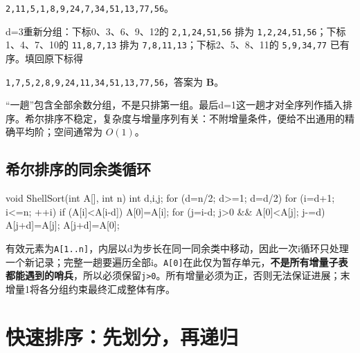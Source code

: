 \texttt{2,\allowbreak{}11,\allowbreak{}5,\allowbreak{}1,\allowbreak{}8,\allowbreak{}9,\allowbreak{}24,\allowbreak{}7,\allowbreak{}34,\allowbreak{}51,\allowbreak{}13,\allowbreak{}77,\allowbreak{}56}。

d=3重新分组：下标0、3、6、9、12的 \texttt{2,\allowbreak{}1,\allowbreak{}24,\allowbreak{}51,\allowbreak{}56} 排为 \texttt{1,\allowbreak{}2,\allowbreak{}24,\allowbreak{}51,\allowbreak{}56}；下标1、4、7、10的 \texttt{11,\allowbreak{}8,\allowbreak{}7,\allowbreak{}13} 排为 \texttt{7,\allowbreak{}8,\allowbreak{}11,\allowbreak{}13}；下标2、5、8、11的 \texttt{5,\allowbreak{}9,\allowbreak{}34,\allowbreak{}77} 已有序。填回原下标得

\texttt{1,\allowbreak{}7,\allowbreak{}5,\allowbreak{}2,\allowbreak{}8,\allowbreak{}9,\allowbreak{}24,\allowbreak{}11,\allowbreak{}34,\allowbreak{}51,\allowbreak{}13,\allowbreak{}77,\allowbreak{}56}，答案为 \textbf{B}。

``一趟''包含全部余数分组，不是只排第一组。最后d=1这一趟才对全序列作插入排序。希尔排序不稳定，复杂度与增量序列有关：不附增量条件，便给不出通用的精确平均阶；空间通常为 \(O(1)\)。

\subsection{希尔排序的同余类循环}\label{DS08-shell-code}

\par\medskip\noindent\begin{minipage}{\linewidth}
\begin{codeblock}[language=C++]
void ShellSort(int A[], int n) {
    int d,i,j;
    for (d=n/2; d>=1; d=d/2)
        for (i=d+1; i<=n; ++i)
            if (A[i]<A[i-d]) {
                A[0]=A[i];
                for (j=i-d; j>0 && A[0]<A[j]; j-=d)
                    A[j+d]=A[j];
                A[j+d]=A[0];
            }
}
\end{codeblock}
\end{minipage}\par\medskip

有效元素为\texttt{A[\allowbreak{}1.\allowbreak{}.\allowbreak{}n]\allowbreak{}}，内层以d为步长在同一同余类中移动，因此一次i循环只处理一个新记录；完整一趟要遍历全部i。\texttt{A[\allowbreak{}0]\allowbreak{}}在此仅为暂存单元，\textbf{不是所有增量子表都能遇到的哨兵}，所以必须保留\texttt{j>\allowbreak{}0}。所有增量必须为正，否则无法保证进展；末增量1将各分组约束最终汇成整体有序。

\section{快速排序：先划分，再递归}\label{DS08-06}

